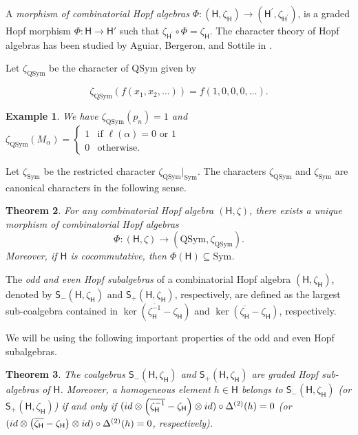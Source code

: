 \documentclass[12pt]{amsart}
\newtheorem{theorem}{Theorem}[section]
\newtheorem{example}[theorem]{Example}
\numberwithin{equation}{section}
\newcommand{\QSym}{\mathrm{QSym}}
\newcommand{\Sym}{\mathrm{Sym}}
\newcommand{\sfS}{\mathsf{S}}
\begin{document}
A {\it morphism of combinatorial Hopf algebras} $\Phi: (\mathsf{H},\zeta_{\mathsf{H}})\rightarrow (\mathsf{H}^{'},\zeta_{\mathsf{H}^{'}})$, is a graded Hopf morphism $\Phi:\mathsf{H}\to\mathsf{H}'$ such that $\zeta_{\mathsf{H}^{'}}\circ \Phi=\zeta_{\mathsf{H}}$. The character theory of Hopf algebras has been studied by Aguiar, Bergeron, and Sottile in \cite{A06}.

Let $\zeta_\QSym$ be the character of $\QSym$ given by

$$\zeta_\QSym(f(x_1,x_2,\dots))=f(1,0,0,0,\dots).$$

\begin{example}
	We have $\zeta_\QSym(p_n)=1$ and $\zeta_\QSym(M_\alpha)=\left\{\begin{array}{cc}
		1 & \text{if }\ell(\alpha)=0\text{ or }1\\
		0 & \text{otherwise.}
		\end{array}\right.$
\end{example}

Let $\zeta_\Sym$ be the restricted character $\zeta_\QSym|_\Sym$. The characters $\zeta_\QSym$ and $\zeta_\Sym$ are canonical characters in the following sense.

\begin{theorem}{\rm \label{thm:ABSmain}\cite[Theorem 4.1]{A06}}
	For any combinatorial Hopf algebra $(\mathsf{H},\zeta)$, there exists a unique morphism of combinatorial Hopf algebras
	$$\Phi: (\mathsf{H},\zeta)\rightarrow (\QSym,\zeta_{\QSym}).$$
	Moreover, if $\mathsf{H}$ is cocommutative, then $\Phi(\mathsf{H})\subseteq\Sym$.
\end{theorem}

The \textit{odd and even Hopf subalgebras} of a combinatorial Hopf algebra $(\mathsf{H},\zeta_\mathsf{H})$, denoted by $\sfS_-(\mathsf{H},\zeta_\mathsf{H})$ and $\sfS_+(\mathsf{H},\zeta_\mathsf{H})$, respectively, are defined as the largest sub-coalgebra contained in $\ker\left(\overline{\zeta_{\mathsf{H}}^{-1}}-\zeta_{\mathsf{H}}\right)$ and $\ker\left(\overline{\zeta_{\mathsf{H}}}-\zeta_{\mathsf{H}}\right)$, respectively.

We will be using the following important properties of the odd and even Hopf subalgebras.

\begin{theorem}{\rm \label{thm:ABSodd}\cite[Theorem 5.3]{A06}}
	The coalgebras $\sfS_-(\mathsf{H},\zeta_\mathsf{H})$ and $\sfS_+(\mathsf{H},\zeta_\mathsf{H})$ are graded Hopf sub-algebras of $\mathsf{H}$. Moreover, a homogeneous element $h\in\mathsf{H}$ belongs to $\sfS_-(\mathsf{H},\zeta_\mathsf{H})$ (or $\sfS_+(\mathsf{H},\zeta_\mathsf{H})$) if and only if $(\rm{id}\otimes \left(\overline{\zeta_{\mathsf{H}}^{-1}}-\zeta_{\mathsf{H}}\right)\otimes\rm{id})\circ \Delta^{(2)}(h)=0$ (or $(\rm{id}\otimes \left(\overline{\zeta_{\mathsf{H}}}-\zeta_{\mathsf{H}}\right)\otimes\rm{id})\circ \Delta^{(2)}(h)=0$, respectively).
\end{theorem}
\end{document}
